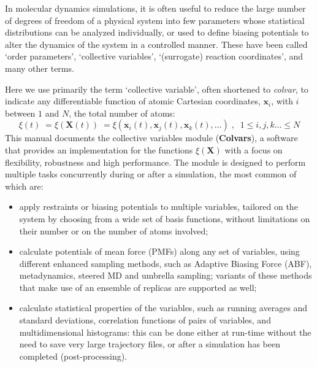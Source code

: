 



In molecular dynamics simulations, it is often useful to reduce the large number of degrees of freedom of a physical system into few parameters whose statistical distributions can be analyzed individually, or used to define biasing potentials to alter the dynamics of the system in a controlled manner.
These have been called `order parameters', `collective variables', `(surrogate) reaction coordinates', and many other terms.

Here we use primarily the term `collective variable', often shortened to \textit{colvar}, to indicate any differentiable function of atomic Cartesian coordinates, $\bm{x}_{i}$, with $i$ between $1$ and $N$, the total
number of atoms:
\begin{equation}
  \label{eq:colvar_basic}
  \xi(t) \; = \xi(\bm{X}(t)) \; = \xi\left(\bm{x}_{i}(t), \bm{x}_{j}(t), \bm{x}_{k}(t),
  \ldots \right)\;, \;\; 1 \leq i,j,k\ldots \leq N
\end{equation}
This manual documents the collective variables module (\textbf{Colvars}), a software that provides an implementation for the functions $\xi(\bm{X})$ with a focus on flexibility, robustness and high performance.
The module is designed to perform multiple tasks concurrently during or after a simulation, the most common of which are:
\begin{itemize}

\item apply restraints or biasing potentials to multiple variables, tailored on the system by choosing from a wide set of basis functions, without limitations on their number or on the number of atoms involved; 

\item calculate potentials of mean force (PMFs) along any set of variables, using different enhanced sampling methods, such as Adaptive Biasing Force (ABF), metadynamics, steered MD and umbrella sampling; variants of these methods that make use of an ensemble of replicas are supported as well;

\item calculate statistical properties of the variables, such as running averages and standard deviations, correlation functions of pairs of variables, and multidimensional histograms: this can be done either at run-time without the need to save very large trajectory files, or after a simulation has been completed (post-processing).

\end{itemize}

